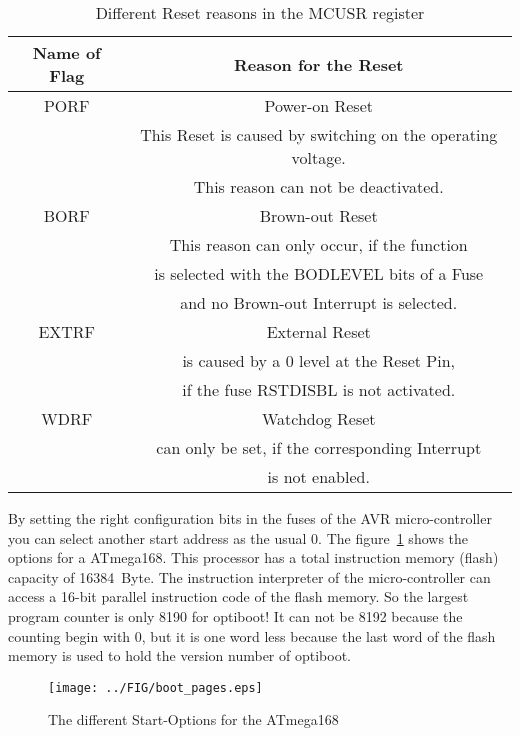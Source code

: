 \begin{table}[H]
  \begin{center}
    \begin{tabular}{| c | c |}
    \hline
              Name of Flag & Reason for the Reset \\
    \hline
    \hline
              PORF & Power-on Reset \\
                   & This Reset is caused by switching on the operating voltage.\\
                   & This reason can not be deactivated.\\
    \hline
              BORF & Brown-out Reset \\
                   & This reason can only occur, if the function \\
                   & is selected with the BODLEVEL bits of a Fuse \\
                   & and no Brown-out Interrupt is selected.\\
    \hline
              EXTRF & External Reset \\
                    & is caused by a 0 level at the Reset Pin, \\
                    & if the fuse  RSTDISBL is not activated. \\
    \hline
              WDRF & Watchdog Reset \\
		   & can only be set, if the corresponding Interrupt \\
		   & is not enabled. \\
    \hline
    \end{tabular}
  \end{center}
  \caption{Different Reset reasons in the MCUSR register}
  \label{tab:resets}
\end{table}

By setting the right configuration bits in the fuses of the AVR micro-controller
you can select another start address as the  usual 0.
The figure~\ref{fig:pages} shows the options for a ATmega168.
This processor has a total instruction memory (flash) capacity of 16384~Byte.
The instruction interpreter of the micro-controller can access a 16-bit
parallel instruction code of the flash memory.
So the largest program counter is only 8190 for optiboot!
It can not be 8192 because the counting begin with 0,
but it is one word less because the last word of the
flash memory is used to hold the version number of optiboot.

\begin{figure}[H]
\centering
\texttt{[image: ../FIG/boot\_pages.eps]}
\caption{The different Start-Options for the ATmega168}
\label{fig:pages}
\end{figure}



